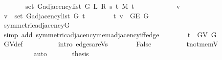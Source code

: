 \begin{isabellebody}
\ \ \isamarkupfalse%
\ \isamarkupfalse%
\ {\isachardoublequoteopen}{\isachardot}{\kern0pt}{\isachardot}{\kern0pt}{\isachardot}{\kern0pt}\ {\isacharequal}{\kern0pt}\ set\ {\isacharparenleft}{\kern0pt}G{\isachardot}{\kern0pt}adjacency{\isacharunderscore}{\kern0pt}list\ {\isacharparenleft}{\kern0pt}G{}\ L\ R\ s\ t\ M{\isacharparenright}{\kern0pt}\ t{\isacharparenright}{\kern0pt}{\isachardoublequoteclose}\isanewline
\ \ \isamarkupfalse%
\ {\isacharminus}{\kern0pt}\isanewline
\ \ \ \ \isacommand{{\isacharbraceleft}{\kern0pt}}\isamarkupfalse%
\ \isamarkupfalse%
\ v\isanewline
\ \ \ \ \ \ \isamarkupfalse%
\ {\isachardoublequoteopen}v\ {\isasymin}\ set\ {\isacharparenleft}{\kern0pt}G{\isachardot}{\kern0pt}adjacency{\isacharunderscore}{\kern0pt}list\ G\ t{\isacharparenright}{\kern0pt}{\isachardoublequoteclose}\isanewline
\ \ \ \ \ \ \isamarkupfalse%
\ {\isachardoublequoteopen}{\isacharbraceleft}{\kern0pt}t{\isacharcomma}{\kern0pt}\ v{\isacharbraceright}{\kern0pt}\ {\isasymin}\ G{\isachardot}{\kern0pt}E\ G{\isachardoublequoteclose}\isanewline
\ \ \ \ \ \ \ \ \isamarkupfalse%
\ symmetric{\isacharunderscore}{\kern0pt}adjacency{\isacharunderscore}{\kern0pt}G\isanewline
\ \ \ \ \ \ \ \ \isamarkupfalse%
\ {\isacharparenleft}{\kern0pt}simp\ add{\isacharcolon}{\kern0pt}\ symmetric{\isacharunderscore}{\kern0pt}adjacency{\isachardot}{\kern0pt}mem{\isacharunderscore}{\kern0pt}adjacency{\isacharunderscore}{\kern0pt}iff{\isacharunderscore}{\kern0pt}edge{\isacharparenright}{\kern0pt}\isanewline
\ \ \ \ \ \ \isamarkupfalse%
\ {\isachardoublequoteopen}t\ {\isasymin}\ G{\isachardot}{\kern0pt}V\ G{\isachardoublequoteclose}\isanewline
\ \ \ \ \ \ \ \ \isamarkupfalse%
\ G{\isachardot}{\kern0pt}V{\isacharunderscore}{\kern0pt}def\isanewline
\ \ \ \ \ \ \ \ \isamarkupfalse%
\ {\isacharparenleft}{\kern0pt}intro\ edges{\isacharunderscore}{\kern0pt}are{\isacharunderscore}{\kern0pt}Vs{\isacharparenright}{\kern0pt}\isanewline
\ \ \ \ \ \ \isamarkupfalse%
\ False\isanewline
\ \ \ \ \ \ \ \ \isamarkupfalse%
\ t{\isacharunderscore}{\kern0pt}not{\isacharunderscore}{\kern0pt}mem{\isacharunderscore}{\kern0pt}V\isanewline
\ \ \ \ \ \ \ \ \isamarkupfalse%
\ auto\ \isacommand{{\isacharbraceright}{\kern0pt}}\isamarkupfalse%
\isanewline
\ \ \ \ \isamarkupfalse%
\ {\isacharquery}{\kern0pt}thesis\isanewline
\ \ \ \ \ \ \isamarkupfalse%

\end{isabellebody}
